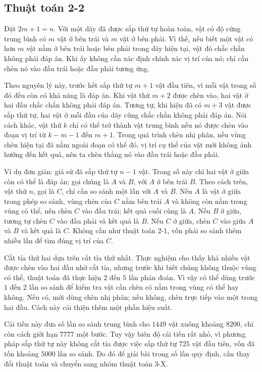 \documentclass[11pt]{article}
\begin{document}
\subsection{Thuật toán 2-2}

Đặt $2m+1=n$. Với một dãy đã được sắp thứ tự hoàn toàn, vật có độ cứng trung
bình có $m$ vật ở bên trái và $m$ vật ở bên phải. Vì thế, nếu biết một vật có
hơn $m$ vật nằm ở bên trái hoặc bên phải trong dãy hiện tại, vật đó chắc chắn
không phải đáp án. Khi ấy không cần xác định chính xác vị trí của nó; chỉ cần
chèn nó vào đầu trái hoặc đầu phải tương ứng.

Theo nguyên lý này, trước hết sắp thứ tự $m+1$ vật đầu tiên, vì mỗi vật trong
số đó đều còn có khả năng là đáp án. Khi vật thứ $m+2$ được chèn vào, hai vật
ở hai đầu chắc chắn không phải đáp án. Tương tự, khi hiện đã có $m+3$ vật được
sắp thứ tự, hai vật ở mỗi đầu của dãy cũng chắc chắn không phải đáp án. Nói
cách khác, vật thứ $k$ chỉ có thể trở thành vật trung bình nếu nó được chèn
vào đoạn vị trí từ $k-m-1$ đến $m+1$. Trong quá trình chèn nhị phân, nếu vùng
chèn hiện tại đã nằm ngoài đoạn có thể đó, vị trí cụ thể của vật mới không ảnh
hưởng đến kết quả, nên ta chèn thẳng nó vào đầu trái hoặc đầu phải.

Ví dụ đơn giản: giả sử đã sắp thứ tự $n-1$ vật. Trong số này chỉ hai vật ở
giữa còn có thể là đáp án; gọi chúng là $A$ và $B$, với $A$ ở bên trái $B$.
Theo cách trên, vật thứ $n$, gọi là $C$, chỉ cần so sánh một lần với $A$ và
$B$. Nếu $A$ là vật ở giữa trong phép so sánh, vùng chèn của $C$ nằm bên trái
$A$ và không còn nằm trong vùng có thể, nên chèn $C$ vào đầu trái; kết quả
cuối cùng là $A$. Nếu $B$ ở giữa, tương tự chèn $C$ vào đầu phải và kết quả là
$B$. Nếu $C$ ở giữa, chèn $C$ vào giữa $A$ và $B$ và kết quả là $C$. Không cần
như thuật toán 2-1, vốn phải so sánh thêm nhiều lần để tìm đúng vị trí của
$C$.

Cắt tỉa thứ hai dựa trên cắt tỉa thứ nhất. Thực nghiệm cho thấy khá nhiều vật
được chèn vào hai đầu nhờ cắt tỉa, nhưng trước khi biết chúng không thuộc vùng
có thể, thuật toán đã thực hiện $2$ đến $5$ lần phán đoán. Vì vậy có thể dùng
trước $1$ đến $2$ lần so sánh để kiểm tra vật cần chèn có nằm trong vùng có
thể hay không. Nếu có, mới dùng chèn nhị phân; nếu không, chèn trực tiếp vào
một trong hai đầu. Cách này cải thiện thêm một phần hiệu suất.

Cải tiến này đưa số lần so sánh trung bình cho $1449$ vật xuống khoảng
$8200$, chỉ còn cách giới hạn $7777$ một bước. Tuy vậy biên độ cải tiến rất
nhỏ, vì phương pháp sắp thứ tự này không cắt tỉa được việc sắp thứ tự $725$
vật đầu tiên, vốn đã tốn khoảng $5000$ lần so sánh. Do đó để giải bài trong
số lần quy định, cần thay đổi thuật toán và chuyển sang nhóm thuật toán 3-X.
\end{document}

